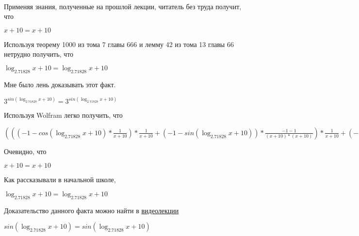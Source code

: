 \documentclass[12pt,a4paper,fleqn]{article}
\theoremstyle{definition}
\begin{document}
Применяя знания, полученные на прошлой лекции, читатель без труда получит, что 

$ x  +  10  =  x  +  10 $

Используя теорему 1000 из тома 7 главы 666 и лемму 42 из тома 13 главы 66 нетрудно получить, что 

$\log_{ 2.71828 }{ x  +  10 } = \log_{ 2.71828 }{ x  +  10 }$

Мне было лень доказывать этот факт.

${ 3 }^{sin(\log_{ 2.71828 }{ x  +  10 })} = { 3 }^{sin(\log_{ 2.71828 }{ x  +  10 })}$

Используя Wolfram легко получить, что 

$((( -1  - cos(\log_{ 2.71828 }{ x  +  10 }) * \frac{ 1 }{ x  +  10 }
) * \frac{ 1 }{ x  +  10 }
 + ( -1  - sin(\log_{ 2.71828 }{ x  +  10 })) * \frac{ -1  -  1 }{( x  +  10 ) * ( x  +  10 )}
) * \frac{ 1 }{ x  +  10 }
 + ( -1  - sin(\log_{ 2.71828 }{ x  +  10 })) * \frac{ 1 }{ x  +  10 }
 * \frac{ -1  -  1 }{( x  +  10 ) * ( x  +  10 )}
 + ( -1  - sin(\log_{ 2.71828 }{ x  +  10 })) * \frac{ 1 }{ x  +  10 }
 * \frac{ -2 }{( x  +  10 ) * ( x  +  10 )}
 + cos(\log_{ 2.71828 }{ x  +  10 }) * \frac{ -1  -  -2  * ( x  +  10  +  x  +  10 )}{( x  +  10 ) * ( x  +  10 ) * ( x  +  10 ) * ( x  +  10 )}
) * { 3 }^{sin(\log_{ 2.71828 }{ x  +  10 })} = ((( -1  - cos(\log_{ 2.71828 }{ x  +  10 }) * \frac{ 1 }{ x  +  10 }
) * \frac{ 1 }{ x  +  10 }
 + ( -1  - sin(\log_{ 2.71828 }{ x  +  10 })) * \frac{ -1  -  1 }{( x  +  10 ) * ( x  +  10 )}
) * \frac{ 1 }{ x  +  10 }
 + ( -1  - sin(\log_{ 2.71828 }{ x  +  10 })) * \frac{ 1 }{ x  +  10 }
 * \frac{ -1  -  1 }{( x  +  10 ) * ( x  +  10 )}
 + ( -1  - sin(\log_{ 2.71828 }{ x  +  10 })) * \frac{ 1 }{ x  +  10 }
 * \frac{ -2 }{( x  +  10 ) * ( x  +  10 )}
 + cos(\log_{ 2.71828 }{ x  +  10 }) * \frac{ -1  -  -2  * ( x  +  10  +  x  +  10 )}{( x  +  10 ) * ( x  +  10 ) * ( x  +  10 ) * ( x  +  10 )}
) * { 3 }^{sin(\log_{ 2.71828 }{ x  +  10 })}$

Очевидно, что 

$ x  +  10  =  x  +  10 $

Как рассказывали в начальной школе, 

$\log_{ 2.71828 }{ x  +  10 } = \log_{ 2.71828 }{ x  +  10 }$

Доказательство данного факта можно найти в \href{https://www.youtube.com/watch?v=dQw4w9WgXcQ}{видеолекции} 

$sin(\log_{ 2.71828 }{ x  +  10 }) = sin(\log_{ 2.71828 }{ x  +  10 })$
\end{document}
